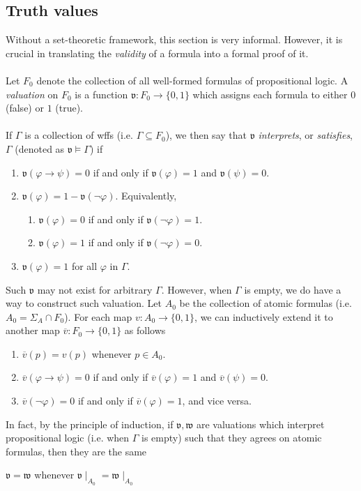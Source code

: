 \documentclass{treatise}
\begin{document}
\subsection{Truth values}
Without a set-theoretic framework, this section is very informal. However, it is crucial in translating the \textit{validity} of a formula into a formal proof of it.
\\
\\
Let $F_0$ denote the collection of all well-formed formulas of propositional logic. A \emph{valuation} on $F_0$ is a function $\mathfrak{v}: F_0 \to \{ 0, 1 \}$ which assigns each formula to either $0$ (false) or $1$ (true).
\\
\\
If $\Gamma$ is a collection of wffs (i.e. $\Gamma \subseteq F_0$), we then say that $\mathfrak{v}$ \emph{interprets}, or \emph{satisfies}, $\Gamma$ (denoted as $\mathfrak{v} \vDash \Gamma$) if
\begin{enumerate}
    \item $\mathfrak{v}(\varphi \to \psi) = 0$ if and only if $\mathfrak{v}(\varphi) = 1$ and $\mathfrak{v}(\psi) = 0$.
    \item $\mathfrak{v}(\varphi) = 1 - \mathfrak{v}(\neg \varphi)$. Equivalently,
    \begin{enumerate}
        \item $\mathfrak{v}(\varphi) = 0$ if and only if $\mathfrak{v}(\neg \varphi) = 1$.
        \item $\mathfrak{v}(\varphi) = 1$ if and only if $\mathfrak{v}(\neg \varphi) = 0$.
    \end{enumerate}
    \item $\mathfrak{v}(\varphi) = 1$ for all $\varphi$ in $\Gamma$.
\end{enumerate}
\begin{remark} \label{logic-gen-val}
Such $\mathfrak{v}$ may not exist for arbitrary $\Gamma$. However, when $\Gamma$ is empty, we do have a way to construct such valuation. Let $A_0$ be the collection of atomic formulas (i.e. $A_0 = \Sigma_A \cap F_0$). For each map $v: A_0 \to \{ 0, 1 \}$, we can inductively extend it to another map $\overline{v}: F_0 \to \{ 0, 1 \}$ as follows
\begin{enumerate}
    \item $\overline{v} (p) = v(p)$ whenever $p \in A_0$.
    \item $\overline{v} (\varphi \to \psi) = 0$ if and only if $\overline{v} (\varphi) = 1$ and $\overline{v} (\psi) = 0$.
    \item $\overline{v} (\neg\varphi) = 0$ if and only if $\overline{v} (\varphi) = 1$, and vice versa.
\end{enumerate}
In fact, by the principle of induction, if $\mathfrak{v}, \mathfrak{w}$ are valuations which interpret propositional logic (i.e. when $\Gamma$ is empty) such that they agrees on atomic formulas, then they are the same
\begin{center}
    $\mathfrak{v} = \mathfrak{w}$ whenever $\mathfrak{v} \mid_{A_0} = \mathfrak{w} \mid_{A_0}$
\end{center}
\end{remark}
\end{document}
